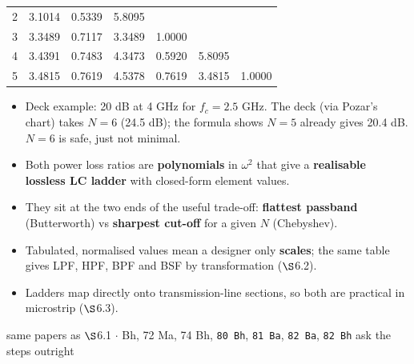 {{\begin{tabularx}{\linewidth}{@{}L{0.5cm}XXXXXX@{}}
2 & 3.1014 & 0.5339 & 5.8095 & & & \\
3 & 3.3489 & 0.7117 & 3.3489 & 1.0000 & & \\
4 & 3.4391 & 0.7483 & 4.3473 & 0.5920 & 5.8095 & \\
5 & 3.4815 & 0.7619 & 4.5378 & 0.7619 & 3.4815 & 1.0000 \\
\bottomrule
\end{tabularx}}
\begin{itemize}
  \item Deck example: 20 dB at 4 GHz for $f_c = 2.5$ GHz. The deck (via Pozar's chart)
    takes $N = 6$ (24.5 dB); the formula shows $N = 5$ already gives 20.4 dB. $N = 6$ is
    safe, just not minimal. \added{}
\end{itemize}}

\par{}
{\color{sub}\footnotesize {}}
\begin{itemize}
  \item Both power loss ratios are \textbf{polynomials} in $\omega^2$ that give a
    \textbf{realisable lossless LC ladder} with closed-form element values.
  \item They sit at the two ends of the useful trade-off: \textbf{flattest passband}
    (Butterworth) vs \textbf{sharpest cut-off} for a given $N$ (Chebyshev).
  \item Tabulated, normalised values mean a designer only \textbf{scales}; the same table
    gives LPF, HPF, BPF and BSF by transformation ($\S$6.2).
  \item Ladders map directly onto transmission-line sections, so both are practical in
    microstrip ($\S$6.3).
\end{itemize}

\vspace{2pt}


{\color{sub}\footnotesize same papers as $\S$6.1 \gap$\cdot$ Bh, 72 Ma, 74 Bh, \texttt{80 Bh}, \texttt{81 Ba}, \texttt{82 Ba}, \texttt{82 Bh} ask the steps outright}

